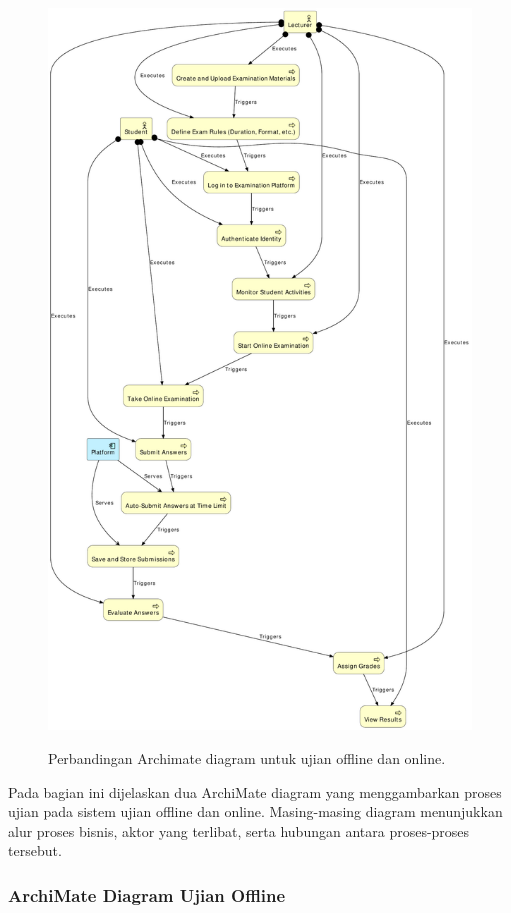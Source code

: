 \begin{figure}[th!]
	[0.49\linewidth]{\includegraphics[width=\linewidth]{../figures/archimate_business_online_exam.pdf}}
	\caption{Perbandingan Archimate diagram untuk ujian offline dan online.}
\end{figure}

Pada bagian ini dijelaskan dua ArchiMate diagram yang menggambarkan proses ujian pada sistem ujian offline dan online. Masing-masing diagram menunjukkan alur proses bisnis, aktor yang terlibat, serta hubungan antara proses-proses tersebut.

\subsubsection{ArchiMate Diagram Ujian Offline}

